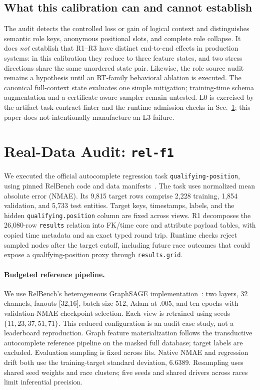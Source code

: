 \documentclass[runningheads]{llncs}
\begin{document}
\subsection{What this calibration can and cannot establish}
The audit detects the controlled loss or gain of logical context and distinguishes semantic role keys, anonymous positional slots, and complete role collapse. It does \emph{not} establish that R1--R3 have distinct end-to-end effects in production systems: in this calibration they reduce to three feature states, and two stress directions share the same unordered state pair. Likewise, the role source audit remains a hypothesis until an RT-family behavioral ablation is executed. The canonical full-context state evaluates one simple mitigation; training-time schema augmentation and a certificate-aware sampler remain untested. L0 is exercised by the artifact task-contract linter and the runtime admission checks in Sec.~\ref{sec:external}; this paper does not intentionally manufacture an L3 failure.

\section{Real-Data Audit: \texttt{rel-f1}}\label{sec:external}
We executed the official autocomplete regression task \texttt{qualifying-position}, using pinned RelBench code and data manifests~\cite{relbenchcode2026,relbenchdata2026}. The task uses normalized mean absolute error (NMAE). Its 9,815 target rows comprise 2,228 training, 1,854 validation, and 5,733 test entities. Target keys, timestamps, labels, and the hidden \texttt{qualifying.position} column are fixed across views. R1 decomposes the 26,080-row \texttt{results} relation into FK/time core and attribute payload tables, with copied time metadata and an exact typed round trip. Runtime checks reject sampled nodes after the target cutoff, including future race outcomes that could expose a qualifying-position proxy through \texttt{results.grid}.

\paragraph{Budgeted reference pipeline.}
We use RelBench's heterogeneous GraphSAGE implementation~\cite{hamilton2017graphsage}: two layers, 32 channels, fanouts [32,16], batch size 512, Adam at .005, and ten epochs with validation-NMAE checkpoint selection. Each view is retrained using seeds $\{11,23,37,51,71\}$. This reduced configuration is an audit case study, not a leaderboard reproduction. Graph feature materialization follows the transductive autocomplete reference pipeline on the masked full database; target labels are excluded. Evaluation sampling is fixed across fits. Native NMAE and regression drift both use the training-target standard deviation, 6.6389. Resampling uses shared seed weights and race clusters; five seeds and shared drivers across races limit inferential precision.
\end{document}
